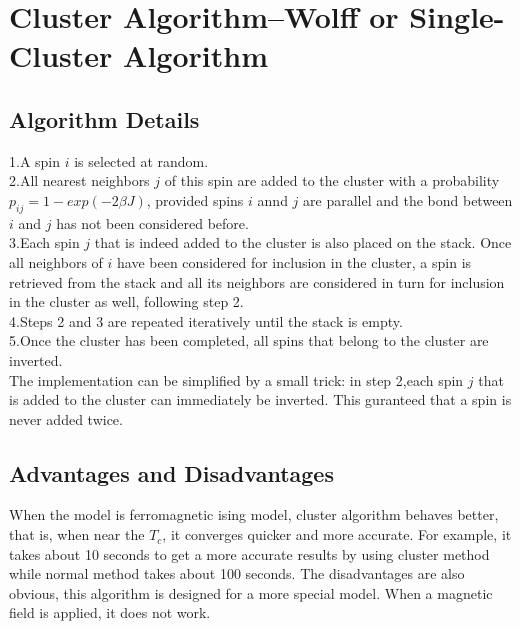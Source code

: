 \documentclass[UTF-8]{article}
\begin{document}
\section{Cluster Algorithm--Wolff or Single-Cluster Algorithm}
\subsection{Algorithm Details}
\begin{framed}
1.A spin $i$ is selected at random.\\
2.All nearest neighbors $j$ of this spin are added to the cluster with a probability $p_{ij}=1-exp(-2\beta J)$, provided spins $i$ annd $j$ are parallel and the bond between $i$ and $j$ has not been considered before.\\
3.Each spin $j$ that is indeed added to the cluster is also placed on the stack. Once all neighbors of $i$ have been considered for inclusion in the cluster, a spin is  retrieved from the stack and all its neighbors are considered in turn for inclusion in the cluster as well, following step 2.\\
4.Steps 2 and 3 are repeated iteratively until the stack is empty.\\
5.Once the cluster has been completed, all spins that belong to the cluster are inverted.\\
The implementation can be simplified by a small trick: in step 2,each spin $j$ that is added to the cluster can immediately be inverted. This guranteed that a spin is never added twice. 
\end{framed}
\subsection{Advantages and Disadvantages}
When the model is ferromagnetic ising model, cluster algorithm behaves better, that is, when near the $T_c$, it converges quicker and more accurate. For example, it takes about 10 seconds to get a more accurate results by using cluster method while normal method takes about 100 seconds. The disadvantages are also obvious, this algorithm is designed for a more special model. When a magnetic field is applied, it does not work.
\end{document}
